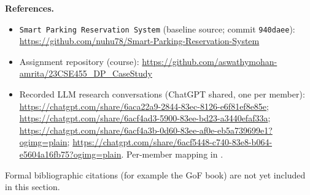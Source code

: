 \documentclass[11pt,a4paper]{article}
\begin{document}
\noindent\textbf{References.}
\begin{sloppypar}
\begin{itemize}
  \item \texttt{Smart Parking Reservation System} (baseline source; commit
        \texttt{940daee}): \url{https://github.com/nuhu78/Smart-Parking-Reservation-System}
  \item Assignment repository (course): \url{https://github.com/aswathymohan-amrita/23CSE455_DP_CaseStudy}
  \item Recorded LLM research conversations (ChatGPT shared, one per member):
        \url{https://chatgpt.com/share/6aca22a9-2844-83ec-8126-e6f81ef8e85e};
        \url{https://chatgpt.com/share/6acf4ad3-5900-83ee-bd23-a3440efaf33a};
        \url{https://chatgpt.com/share/6acf4a3b-0d60-83ee-af0e-eb5a739699e1?ogimg=plain};
        \url{https://chatgpt.com/share/6acf5448-c740-83e8-b064-e5604a16fb75?ogimg=plain}.
        Per-member mapping in .
\end{itemize}
\end{sloppypar}
Formal bibliographic citations (for example the GoF book) are not yet included
in this section.
\end{document}
